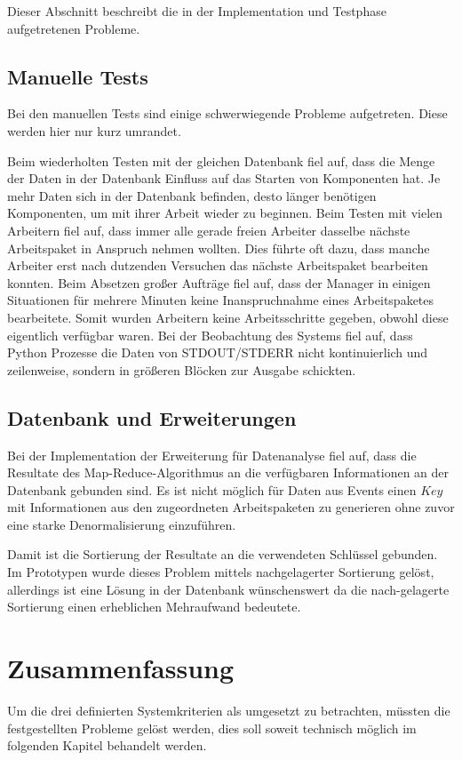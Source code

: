 Dieser Abschnitt  beschreibt die in der Implementation und Testphase aufgetretenen Probleme.

\subsection{Manuelle Tests}

Bei den manuellen Tests sind einige schwerwiegende Probleme aufgetreten.
Diese werden hier nur kurz umrandet.

\begin{itemize}
        Beim wiederholten Testen mit der gleichen Datenbank fiel auf,
        dass die Menge der Daten in der Datenbank Einfluss auf das Starten von Komponenten hat.
        Je mehr Daten sich in der Datenbank befinden, desto länger benötigen Komponenten,
        um mit ihrer Arbeit wieder zu beginnen.
        Beim Testen mit vielen Arbeitern fiel auf, dass immer alle gerade freien Arbeiter
        dasselbe nächste Arbeitspaket in Anspruch nehmen wollten. Dies führte oft dazu,
        dass manche Arbeiter erst nach dutzenden Versuchen das nächste Arbeitspaket bearbeiten konnten.
        Beim Absetzen großer Aufträge fiel auf, dass der Manager in einigen Situationen
        für mehrere Minuten keine Inanspruchnahme eines Arbeitspaketes bearbeitete.
        Somit wurden Arbeitern keine Arbeitsschritte gegeben, obwohl diese eigentlich verfügbar waren.
        Bei der Beobachtung des Systems fiel auf, dass Python Prozesse
        die Daten von STDOUT/STDERR nicht kontinuierlich und zeilenweise,
        sondern in größeren Blöcken zur Ausgabe schickten.
\end{itemize}


\subsection{Datenbank und Erweiterungen}

Bei der Implementation der Erweiterung für Datenanalyse fiel auf,
dass die Resultate des Map-Reduce-Algorithmus an die verfügbaren Informationen an der Datenbank gebunden sind.
Es ist nicht möglich für Daten aus Events einen $Key$ mit Informationen aus den zugeordneten Arbeitspaketen zu generieren ohne zuvor eine starke Denormalisierung einzuführen.

Damit ist die Sortierung der Resultate an die verwendeten Schlüssel gebunden. 
Im Prototypen wurde dieses Problem mittels nachgelagerter Sortierung gelöst,
allerdings ist eine Lösung in der Datenbank wünschenswert da die nach-gelagerte Sortierung einen erheblichen Mehraufwand bedeutete.


\section{Zusammenfassung}
\label{sec:eval:zusammenfassung}
Um die drei definierten Systemkriterien als umgesetzt zu betrachten,
müssten die festgestellten Probleme gelöst werden,
dies soll soweit technisch möglich im folgenden Kapitel behandelt werden.

